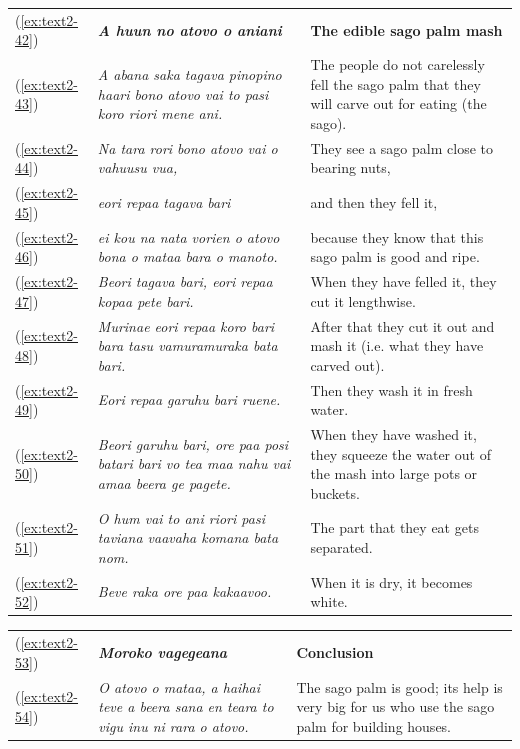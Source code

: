 \documentclass[output=paper]{langscibook}
\begin{document}
\begin{xltabular}{\textwidth}{lXX}
    (\ref{ex:text2-42})&\textit{\textbf{A huun no atovo o aniani}}&\textbf{The edible sago palm mash}\\
    (\ref{ex:text2-43})&\textit{A abana saka tagava pinopino haari bono atovo vai to pasi koro riori mene ani.}&The people do not carelessly fell the sago palm that they will carve out for eating (the sago).\\
    (\ref{ex:text2-44})&\textit{Na tara rori bono atovo vai o vahuusu vua,}&They see a sago palm close to bearing nuts,\\
    (\ref{ex:text2-45})&\textit{eori repaa tagava bari}&and then they fell it,\\
    (\ref{ex:text2-46})&\textit{ei kou na nata vorien o atovo bona o mataa bara o manoto.}&because they know that this sago palm is good and ripe.\\
    (\ref{ex:text2-47})&\textit{Beori tagava bari, eori repaa kopaa pete bari.}&When they have felled it, they cut it lengthwise.\\
    (\ref{ex:text2-48})&\textit{Murinae eori repaa koro bari bara tasu vamuramuraka bata bari.}&After that they cut it out and mash it (i.e. what they have carved out).\\
    (\ref{ex:text2-49})&\textit{Eori repaa garuhu bari ruene.}&Then they wash it in fresh water.\\
    (\ref{ex:text2-50})&\textit{Beori garuhu bari, ore paa posi batari bari vo tea maa nahu vai amaa beera ge pagete.}&When they have washed it, they squeeze the water out of the mash into large pots or buckets.\\
    (\ref{ex:text2-51})&\textit{O hum vai to ani riori pasi taviana vaavaha komana bata nom.}&The part that they eat gets separated.\\
    (\ref{ex:text2-52})&\textit{Beve raka ore paa kakaavoo.}&When it is dry, it becomes white.\\
\end{xltabular}
\begin{xltabular}{\textwidth}{lXX}
    (\ref{ex:text2-53})&\textit{\textbf{Moroko vagegeana}}&\textbf{Conclusion}\\
    (\ref{ex:text2-54})&\textit{O atovo o mataa, a haihai teve a beera sana en teara to vigu inu ni rara o atovo.}&The sago palm is good; its help is very big for us who use the sago palm for building houses.\\
\end{xltabular}
\end{document}
